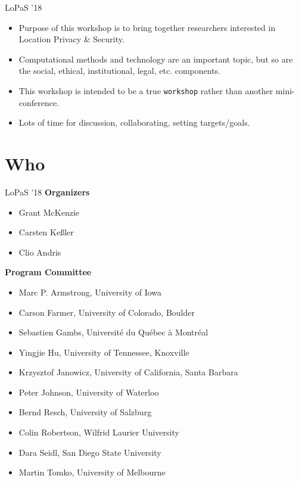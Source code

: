 \documentclass[10pt]{beamer}
\begin{document}
	\begin{frame}{LoPaS '18}
		\begin{itemize}
			\setlength\itemsep{1em}
			\item Purpose of this workshop is to bring together researchers interested in Location Privacy \& Security.
			\pause
			\item Computational methods and technology are an important topic, but so are the social, ethical, institutional, legal, etc. components.
			\pause
			\item This workshop is intended to be a true \texttt{workshop} rather than another mini-conference.
			\pause
			\item Lots of time for discussion, collaborating, setting targets/goals.
		\end{itemize}
	\end{frame}

	\section{Who}

	\begin{frame}{LoPaS '18}
		\textbf{Organizers}
		\begin{itemize}
			\item Grant McKenzie
			\item Carsten Ke{\ss}ler
			\item Clio Andris
		\end{itemize}
		\textbf{Program Committee}
		\begin{itemize}
			\item Marc P. Armstrong, University of Iowa
			\item Carson Farmer, University of Colorado, Boulder
			\item Sebastien Gambs, Université du Québec à Montréal
			\item Yingjie Hu, University of Tennessee, Knoxville
			\item Krzysztof Janowicz, University of California, Santa Barbara
			\item Peter Johnson, University of Waterloo
			\item Bernd Resch, University of Salzburg
			\item Colin Robertson, Wilfrid Laurier University
			\item Dara Seidl, San Diego State University
			\item Martin Tomko, University of Melbourne
		\end{itemize}
	\end{frame}
\end{document}
